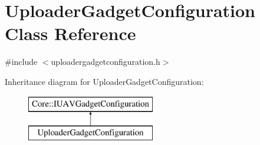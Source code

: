 \hypertarget{class_uploader_gadget_configuration}{\section{\-Uploader\-Gadget\-Configuration \-Class \-Reference}
\label{class_uploader_gadget_configuration}
}


{\ttfamily \#include $<$uploadergadgetconfiguration.\-h$>$}

\-Inheritance diagram for \-Uploader\-Gadget\-Configuration\-:\begin{figure}[H]
\begin{center}
\leavevmode
\includegraphics[height=2.000000cm]{class_uploader_gadget_configuration}
\end{center}
\end{figure}
